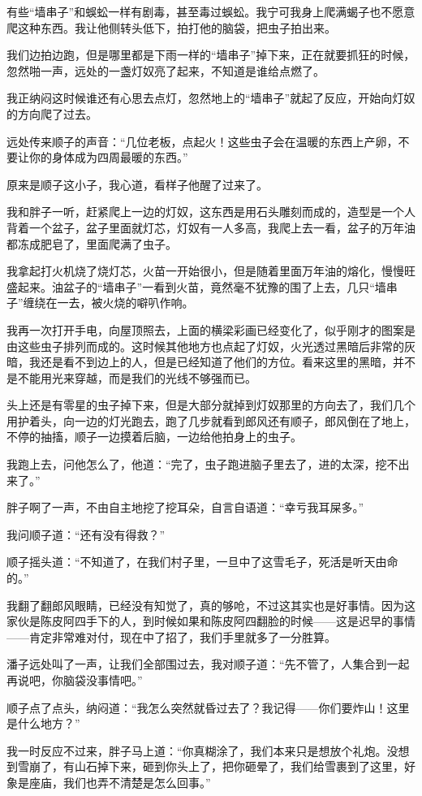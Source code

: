 有些“墙串子”和蜈蚣一样有剧毒，甚至毒过蜈蚣。我宁可我身上爬满蝎子也不愿意爬这种东西。我让他侧转头低下，拍打他的脑袋，把虫子拍出来。

我们边拍边跑，但是哪里都是下雨一样的“墙串子”掉下来，正在就要抓狂的时候，忽然啪一声，远处的一盏灯奴亮了起来，不知道是谁给点燃了。

我正纳闷这时候谁还有心思去点灯，忽然地上的“墙串子”就起了反应，开始向灯奴的方向爬了过去。

远处传来顺子的声音：“几位老板，点起火！这些虫子会在温暖的东西上产卵，不要让你的身体成为四周最暖的东西。”

原来是顺子这小子，我心道，看样子他醒了过来了。

我和胖子一听，赶紧爬上一边的灯奴，这东西是用石头雕刻而成的，造型是一个人背着一个盆子，盆子里面就灯芯，灯奴有一人多高，我爬上去一看，盆子的万年油都冻成肥皂了，里面爬满了虫子。

我拿起打火机烧了烧灯芯，火苗一开始很小，但是随着里面万年油的熔化，慢慢旺盛起来。油盆子的“墙串子”一看到火苗，竟然毫不犹豫的围了上去，几只“墙串子”缠绕在一去，被火烧的噼叭作响。

我再一次打开手电，向屋顶照去，上面的横梁彩画已经变化了，似乎刚才的图案是由这些虫子排列而成的。这时候其他地方也点起了灯奴，火光透过黑暗后非常的灰暗，我还是看不到边上的人，但是已经知道了他们的方位。看来这里的黑暗，并不是不能用光来穿越，而是我们的光线不够强而已。

头上还是有零星的虫子掉下来，但是大部分就掉到灯奴那里的方向去了，我们几个用护着头，向一边的灯光跑去，跑了几步就看到郎风还有顺子，郎风倒在了地上，不停的抽搐，顺子一边摸着后脑，一边给他拍身上的虫子。

我跑上去，问他怎么了，他道：“完了，虫子跑进脑子里去了，进的太深，挖不出来了。”

胖子啊了一声，不由自主地挖了挖耳朵，自言自语道：“幸亏我耳屎多。”

我问顺子道：“还有没有得救？”

顺子摇头道：“不知道了，在我们村子里，一旦中了这雪毛子，死活是听天由命的。”

我翻了翻郎风眼睛，已经没有知觉了，真的够呛，不过这其实也是好事情。因为这家伙是陈皮阿四手下的人，到时候如果和陈皮阿四翻脸的时候——这是迟早的事情——肯定非常难对付，现在中了招了，我们手里就多了一分胜算。

潘子远处叫了一声，让我们全部围过去，我对顺子道：“先不管了，人集合到一起再说吧，你脑袋没事情吧。”

顺子点了点头，纳闷道：“我怎么突然就昏过去了？我记得——你们要炸山！这里是什么地方？”

我一时反应不过来，胖子马上道：“你真糊涂了，我们本来只是想放个礼炮。没想到雪崩了，有山石掉下来，砸到你头上了，把你砸晕了，我们给雪裹到了这里，好象是座庙，我们也弄不清楚是怎么回事。”

